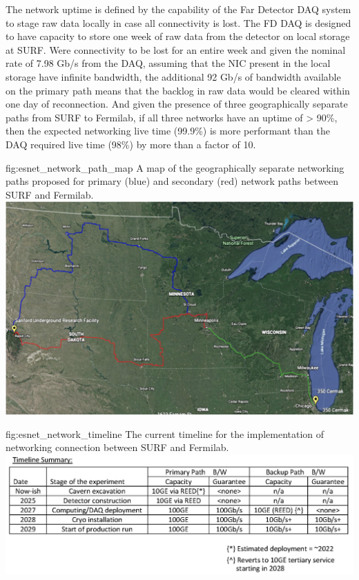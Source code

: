 \documentclass[../main-v1.tex]{subfiles}
\begin{document}
The network uptime is defined by the capability of the Far Detector DAQ system to stage raw data locally in case all connectivity is lost. The FD DAQ is designed to have capacity to store one week of raw data from the detector on local storage at SURF. Were connectivity to be lost for an entire week and given the nominal rate of 7.98 Gb/s from the DAQ, assuming that the NIC present in the local storage have infinite bandwidth, the additional 92 Gb/s of bandwidth available on the primary path means that the backlog in raw data would be cleared within one day of reconnection. And given the presence of three geographically separate paths from SURF to Fermilab, if all three networks have an uptime of > 90\%, then the expected networking live time (99.9\%) is more performant than the DAQ required live time (98\%) by more than a factor of 10.

\begin{dunefigure}
{fig:esnet_network_path_map} 
{A map of the geographically separate networking paths proposed for primary (blue) and secondary (red) network paths between SURF and Fermilab.}
\includegraphics[width=0.9\columnwidth]{graphics/Networking/DUNE_ESNet_network_path.png}
\end{dunefigure}

\begin{dunefigure}
{fig:esnet_network_timeline} 
{The current timeline for the implementation of networking connection between SURF and Fermilab.}
\includegraphics[width=0.9\columnwidth]{graphics/Networking/networking_timeline.png}
\end{dunefigure}
\end{document}
